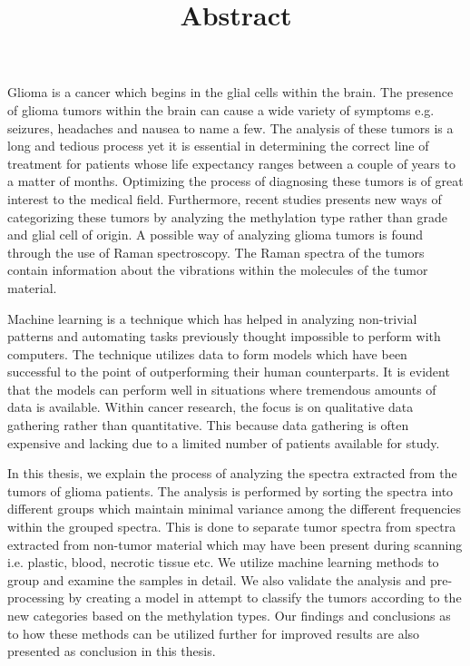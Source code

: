 \title{Abstract}

Glioma is a cancer which begins in the glial cells within the brain. The presence of glioma tumors within the brain can cause a wide variety of symptoms e.g. seizures, headaches and nausea to name a few. The analysis of these tumors is a long and tedious process yet it is essential in determining the correct line of treatment for patients whose life expectancy ranges between a couple of years to a matter of months. Optimizing the process of diagnosing these tumors is of great interest to the medical field. Furthermore, recent studies presents new ways of categorizing these tumors by analyzing the methylation type rather than grade and glial cell of origin. A possible way of analyzing glioma tumors is found through the use of Raman spectroscopy. The Raman spectra of the tumors contain information about the vibrations within the molecules of the tumor material.

Machine learning is a technique which has helped in analyzing non-trivial patterns  and automating tasks previously thought impossible to perform with computers. The technique utilizes data to form models which have been successful to the point of outperforming their human counterparts. It is evident that the models can perform well in situations where tremendous amounts of data is available. Within cancer research, the focus is on qualitative data gathering rather than quantitative. This because data gathering is often expensive and lacking due to a limited number of patients available for study.  

In this thesis, we explain the process of analyzing the spectra extracted from the tumors of glioma patients. The analysis is performed by sorting the spectra into different groups which maintain minimal variance among the different frequencies within the grouped spectra. This is done to separate tumor spectra from spectra extracted from non-tumor material which may have been present during scanning i.e. plastic, blood, necrotic tissue etc. We utilize machine learning methods to group and examine the samples in detail. We also validate the analysis and pre-processing by creating a model in attempt to classify the tumors according to the new categories based on the methylation types. Our findings and conclusions as to how these methods can be utilized further for improved results are also presented as conclusion in this thesis.  

